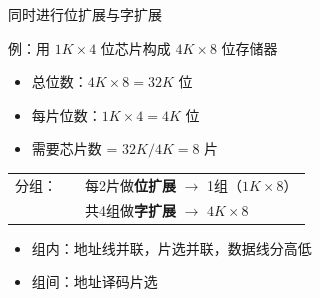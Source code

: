 \documentclass[10pt, aspectratio=169]{beamer}
\begin{document}
\begin{frame}{同时进行位扩展与字扩展}
    \begin{exampleblock}{例：用 $1K \times 4$ 位芯片构成 $4K \times 8$ 位存储器}
        \begin{itemize}
            \item 总位数：$4K \times 8 = 32K$ 位
            \item 每片位数：$1K \times 4 = 4K$ 位
            \item 需要芯片数 = $32K / 4K = 8$ 片
        \end{itemize}
    \end{exampleblock}
    \vspace{0.3em}
    \begin{center}
        \begin{tabular}{ccl}
            分组： & & 每2片做\textbf{位扩展} $\to$ 1组（$1K \times 8$） \\
                  & & 共4组做\textbf{字扩展} $\to$ $4K \times 8$ \\
        \end{tabular}
    \end{center}
    \vspace{0.3em}
    \begin{itemize}
        \item 组内：地址线并联，片选并联，数据线分高低
        \item 组间：地址译码片选
    \end{itemize}
\end{frame}
\end{document}
